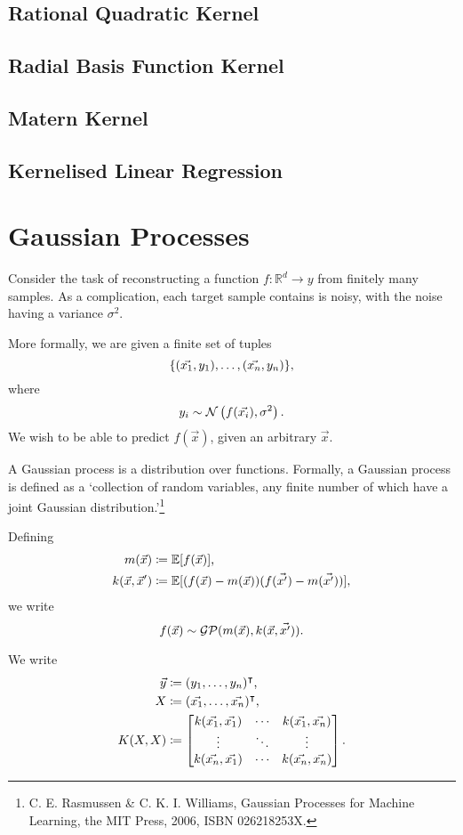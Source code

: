 \documentclass[11pt]{report}
\newcommand\bbE{\mathbb{E}}
\newcommand\bbR{\mathbb{R}}
\newcommand\cG{\mathcal{G}}
\newcommand\cN{\mathcal{N}}
\newcommand\cP{\mathcal{P}}
\begin{document}
\subsection{Rational Quadratic Kernel}

\subsection{Radial Basis Function Kernel}

\subsection{Matern Kernel}


\subsection{Kernelised Linear Regression}




\section{Gaussian Processes}
Consider the task of reconstructing a function $f: \bbR^d \to y$ from finitely many samples. As a complication, each target sample contains is noisy, with the noise having a variance $\sigma^2$.

More formally, we are given a finite set of tuples\[
    \{ (\vec{x_1}, y_1), \dots, (\vec{x_n}, y_n) \}\text,
\] where \[
    y_i \sim \cN\left(f(\vec{x_i}), \sigma^2\right)\text.
\] We wish to be able to predict $f(\vec{x})$, given an arbitrary $\vec{x}$.

A Gaussian process is a distribution over functions. Formally, a Gaussian process is defined as a `collection of random variables, any finite number of which have a joint Gaussian distribution.'\footnote{C. E. Rasmussen \& C. K. I. Williams, Gaussian Processes for Machine Learning, the MIT Press, 2006, ISBN 026218253X.}

Defining \begin{align*}
    m(\vec{x}) &\coloneqq \bbE[f(\vec{x})] \text, \\
    k(\vec{x}, \vec{x}') &\coloneqq \bbE[(f(\vec{x}) - m(\vec{x}))(f(\vec{x'}) - m(\vec{x'}))],
\end{align*} we write \[
    f(\vec{x}) \sim \cG\cP(m(\vec{x}), k(\vec{x}, \vec{x'}))\text.
\]

We write \begin{align*}
    \vec y &\coloneqq (y_1, \dots, y_n)^\intercal \text, \\
    X &\coloneqq (\vec{x_1}, \dots, \vec{x_n})^\intercal \text, \\
    K(X, X) &\coloneqq \begin{bmatrix}
        k(\vec{x_1}, \vec{x_1}) & \cdots & k(\vec{x_1}, \vec{x_n}) \\
        \vdots & \ddots & \vdots \\
        k(\vec{x_n}, \vec{x_1}) & \cdots & k(\vec{x_n}, \vec{x_n})
    \end{bmatrix}\text.
\end{align*}
\end{document}
